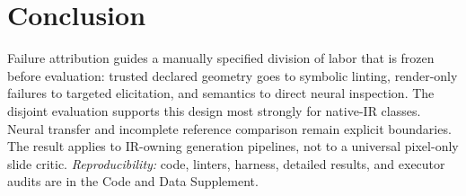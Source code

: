 \documentclass[letterpaper]{article}            %
\begin{document}
\section{Conclusion}

Failure attribution guides a manually specified division of labor that is frozen before evaluation: trusted declared
geometry goes to symbolic linting, render-only failures to targeted elicitation, and semantics to direct neural
inspection. The disjoint evaluation supports this design most strongly for native-IR classes. Neural transfer
and incomplete reference comparison remain explicit boundaries. The result applies to
IR-owning generation pipelines, not to a universal pixel-only slide critic. \emph{Reproducibility:} code,
linters, harness, detailed results, and executor audits are in the Code and Data Supplement.

\clearpage

\end{document}
